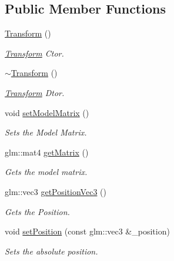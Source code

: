 \subsection*{Public Member Functions}
\begin{DoxyCompactItemize}
\item 
\hyperlink{class_cookie_eng_1_1_components_1_1_transform_a477bc2eb1d09fecdcb7399d5124ccd0d}{Transform} ()
\begin{DoxyCompactList}\small\item\em \hyperlink{class_cookie_eng_1_1_components_1_1_transform}{Transform} Ctor. \end{DoxyCompactList}\item 
\hyperlink{class_cookie_eng_1_1_components_1_1_transform_ad07b4e7f04ec0c60646339be8b67c69c}{$\sim$\+Transform} ()
\begin{DoxyCompactList}\small\item\em \hyperlink{class_cookie_eng_1_1_components_1_1_transform}{Transform} Dtor. \end{DoxyCompactList}\item 
void \hyperlink{class_cookie_eng_1_1_components_1_1_transform_a169960289f66442f692bb52c4c86478e}{set\+Model\+Matrix} ()
\begin{DoxyCompactList}\small\item\em Sets the Model Matrix. \end{DoxyCompactList}\item 
glm\+::mat4 \hyperlink{class_cookie_eng_1_1_components_1_1_transform_a0d18917e8701c84b6759823f785969de}{get\+Matrix} ()
\begin{DoxyCompactList}\small\item\em Gets the model matrix. \end{DoxyCompactList}\item 
glm\+::vec3 \hyperlink{class_cookie_eng_1_1_components_1_1_transform_a20c33650a735e8c9c54b232e871ff526}{get\+Position\+Vec3} ()
\begin{DoxyCompactList}\small\item\em Gets the Position. \end{DoxyCompactList}\item 
void \hyperlink{class_cookie_eng_1_1_components_1_1_transform_ac20843bb62dfdf7fce9fa96368b5a807}{set\+Position} (const glm\+::vec3 \&\+\_\+position)
\begin{DoxyCompactList}\small\item\em Sets the absolute position. \end{DoxyCompactList}\item 

\end{DoxyCompactItemize}
